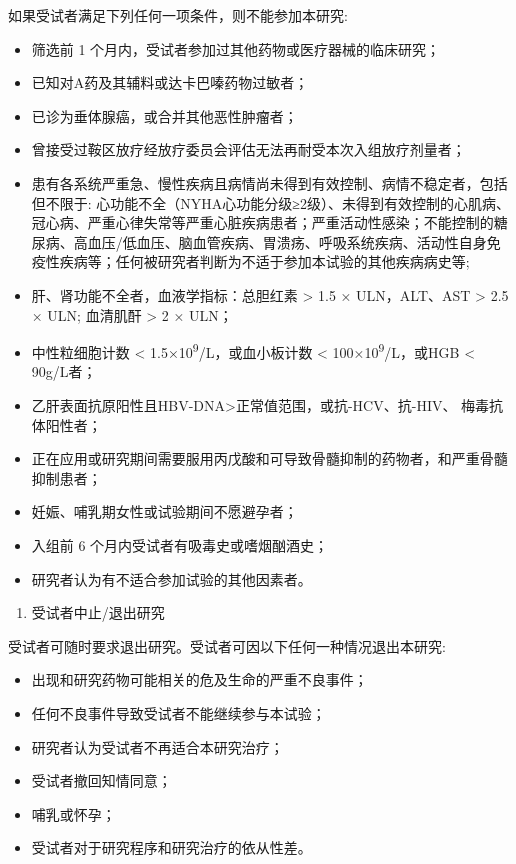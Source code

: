 \documentclass[
  chinese-hans,
  letterpaper,
  DIV=11,
  numbers=noendperiod]{scrreprt}
\providecommand{\tightlist}{%
  \setlength{\itemsep}{0pt}\setlength{\parskip}{0pt}}
\begin{document}
如果受试者满足下列任何一项条件，则不能参加本研究:

\begin{itemize}
\item
  筛选前 1 个月内，受试者参加过其他药物或医疗器械的临床研究；
\item
  已知对A药及其辅料或达卡巴嗪药物过敏者；
\item
  已诊为垂体腺癌，或合并其他恶性肿瘤者；
\item
  曾接受过鞍区放疗经放疗委员会评估无法再耐受本次入组放疗剂量者；
\item
  患有各系统严重急、慢性疾病且病情尚未得到有效控制、病情不稳定者，包括但不限于:
  心功能不全（NYHA心功能分级≥2级）、未得到有效控制的心肌病、冠心病、严重心律失常等严重心脏疾病患者；严重活动性感染；不能控制的糖尿病、高血压/低血压、脑血管疾病、胃溃疡、呼吸系统疾病、活动性自身免疫性疾病等；任何被研究者判断为不适于参加本试验的其他疾病病史等;
\item
  肝、肾功能不全者，血液学指标：总胆红素 \textgreater{} 1.5 ×
  ULN，ALT、AST \textgreater{} 2.5 × ULN; 血清肌酐 \textgreater{} 2 ×
  ULN；
\item
  中性粒细胞计数 \textless{} 1.5×10\textsuperscript{9}/L，或血小板计数
  \textless{} 100×10\textsuperscript{9}/L，或HGB \textless{} 90g/L者；
\item
  乙肝表面抗原阳性且HBV-DNA\textgreater 正常值范围，或抗-HCV、抗-HIV、
  梅毒抗体阳性者；
\item
  正在应用或研究期间需要服用丙戊酸和可导致骨髓抑制的药物者，和严重骨髓抑制患者；
\item
  妊娠、哺乳期女性或试验期间不愿避孕者；
\item
  入组前 6 个月内受试者有吸毒史或嗜烟酗酒史；
\item
  研究者认为有不适合参加试验的其他因素者。
\end{itemize}

\begin{enumerate}
\def\labelenumi{\arabic{enumi}.}
\setcounter{enumi}{2}
\tightlist
\item
  受试者中止/退出研究
\end{enumerate}

受试者可随时要求退出研究。受试者可因以下任何一种情况退出本研究:

\begin{itemize}
\item
  出现和研究药物可能相关的危及生命的严重不良事件；
\item
  任何不良事件导致受试者不能继续参与本试验；
\item
  研究者认为受试者不再适合本研究治疗；
\item
  受试者撤回知情同意；
\item
  哺乳或怀孕；
\item
  受试者对于研究程序和研究治疗的依从性差。
\end{itemize}
\end{document}
